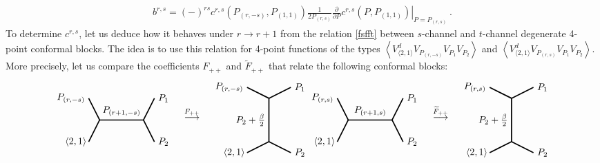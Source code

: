 \documentclass[12pt, a4paper]{article}
\theoremstyle{break}
\begin{document}
\begin{align}
 b^{r,s} = (-)^{rs} c^{r,s}\left(P_{(r,-s)},P_{(1,1)}\right)  \frac{1}{2P_{(r,s)}}\left.\frac{\partial}{\partial P} c^{r,s}\left(P,P_{(1,1)}\right)\right|_{P=P_{(r,s)}}\ . 
 \label{bcdc}
\end{align}
To determine $c^{r,s}$, let us deduce how it behaves under $r\to r+1$ from the relation \eqref{fsfft} between $s$-channel and $t$-channel degenerate 4-point conformal blocks. The idea is to use this relation for 4-point functions of the types $\left<V^d_{\langle 2,1\rangle}V_{P_{(r,-s)}}V_{P_1}V_{P_2}\right>$ and $\left<V^d_{\langle 2,1\rangle}V_{P_{(r,s)}}V_{P_1}V_{P_2}\right>$. More precisely, let us compare the coefficients $F_{++}$ and $\widetilde{F}_{++}$ that relate the following conformal blocks:
\begin{subequations}
\begin{align}
  \begin{tikzpicture}[baseline=(current  bounding  box.center), very thick, scale = .4]
\draw (-1,2) node [left] {$P_{(r,-s)}$} -- (0,0) -- node [above] {$P_{(r+1,-s)}$} (4,0) -- (5,2) node [right] {$P_1$};
\draw (-1,-2) node [left] {$\langle 2,1\rangle\!$} -- (0,0);
\draw (4,0) -- (5,-2) node [right] {$P_2$};
\end{tikzpicture}
\quad \overset{F_{++}}{\longrightarrow} \quad 
\begin{tikzpicture}[baseline=(current  bounding  box.center), very thick, scale = .4]
 \draw (-2,3) node [left] {$P_{(r,-s)}$} -- (0,2) -- node [left] {$P_2+\frac{\beta}{2}$} (0,-2) -- (-2, -3) node [left] {$\langle 2,1\rangle\!$};
\draw (0,2) -- (2,3) node [right] {$P_1$};
\draw (0,-2) -- (2, -3) node [right] {$P_2$};
\end{tikzpicture}
\end{align}
\begin{align}
\begin{tikzpicture}[baseline=(current  bounding  box.center), very thick, scale = .4]
\draw (-1,2) node [left] {$P_{(r,s)}$} -- (0,0) -- node [above] {$P_{(r+1,s)}$} (4,0) -- (5,2) node [right] {$P_1$};
\draw (-1,-2) node [left] {$\langle 2,1\rangle\!$} -- (0,0);
\draw (4,0) -- (5,-2) node [right] {$P_2$};
\end{tikzpicture}
\quad \overset{\widetilde{F}_{++}}{\longrightarrow} \quad 
\begin{tikzpicture}[baseline=(current  bounding  box.center), very thick, scale = .4]
 \draw (-2,3) node [left] {$P_{(r,s)}$} -- (0,2) -- node [left] {$P_2+\frac{\beta}{2}$} (0,-2) -- (-2, -3) node [left] {$\langle 2,1\rangle\!$};
\draw (0,2) -- (2,3) node [right] {$P_1$};
\draw (0,-2) -- (2, -3) node [right] {$P_2$};
\end{tikzpicture}
\end{align}
\end{subequations}
\end{document}
